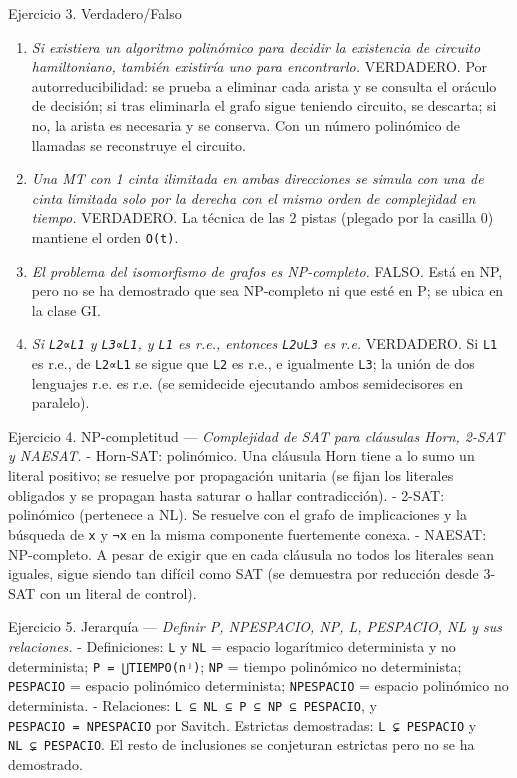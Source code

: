 \documentclass[12pt]{book} %
\providecommand{\tightlist}{%
  \setlength{\itemsep}{0pt}\setlength{\parskip}{0pt}}
\begin{document}
Ejercicio 3. Verdadero/Falso

\begin{enumerate}
\def\labelenumi{\arabic{enumi}.}
\tightlist
\item
  \emph{Si existiera un algoritmo polinómico para decidir la existencia
  de circuito hamiltoniano, también existiría uno para encontrarlo.}
  VERDADERO. Por autorreducibilidad: se prueba a eliminar cada arista y
  se consulta el oráculo de decisión; si tras eliminarla el grafo sigue
  teniendo circuito, se descarta; si no, la arista es necesaria y se
  conserva. Con un número polinómico de llamadas se reconstruye el
  circuito.
\item
  \emph{Una MT con 1 cinta ilimitada en ambas direcciones se simula con
  una de cinta limitada solo por la derecha con el mismo orden de
  complejidad en tiempo.} VERDADERO. La técnica de las 2 pistas (plegado
  por la casilla 0) mantiene el orden \texttt{O(t)}.
\item
  \emph{El problema del isomorfismo de grafos es NP-completo.} FALSO.
  Está en NP, pero no se ha demostrado que sea NP-completo ni que esté
  en P; se ubica en la clase GI.
\item
  \emph{Si \texttt{L2∝L1} y \texttt{L3∝L1}, y \texttt{L1} es r.e.,
  entonces \texttt{L2∪L3} es r.e.} VERDADERO. Si \texttt{L1} es r.e., de
  \texttt{L2∝L1} se sigue que \texttt{L2} es r.e., e igualmente
  \texttt{L3}; la unión de dos lenguajes r.e. es r.e. (se semidecide
  ejecutando ambos semidecisores en paralelo).
\end{enumerate}

Ejercicio 4. NP-completitud --- \emph{Complejidad de SAT para cláusulas
Horn, 2-SAT y NAESAT.} - Horn-SAT: polinómico. Una cláusula Horn tiene a
lo sumo un literal positivo; se resuelve por propagación unitaria (se
fijan los literales obligados y se propagan hasta saturar o hallar
contradicción). - 2-SAT: polinómico (pertenece a NL). Se resuelve con el
grafo de implicaciones y la búsqueda de \texttt{x} y \texttt{¬x} en la
misma componente fuertemente conexa. - NAESAT: NP-completo. A pesar de
exigir que en cada cláusula no todos los literales sean iguales, sigue
siendo tan difícil como SAT (se demuestra por reducción desde 3-SAT con
un literal de control).

Ejercicio 5. Jerarquía --- \emph{Definir P, NPESPACIO, NP, L, PESPACIO,
NL y sus relaciones.} - Definiciones: \texttt{L} y \texttt{NL} = espacio
logarítmico determinista y no determinista; \texttt{P\ =\ ⋃TIEMPO(nʲ)};
\texttt{NP} = tiempo polinómico no determinista; \texttt{PESPACIO} =
espacio polinómico determinista; \texttt{NPESPACIO} = espacio polinómico
no determinista. - Relaciones:
\texttt{L\ ⊆\ NL\ ⊆\ P\ ⊆\ NP\ ⊆\ PESPACIO}, y
\texttt{PESPACIO\ =\ NPESPACIO} por Savitch. Estrictas demostradas:
\texttt{L\ ⊊\ PESPACIO} y \texttt{NL\ ⊊\ PESPACIO}. El resto de
inclusiones se conjeturan estrictas pero no se ha demostrado.
\end{document}
